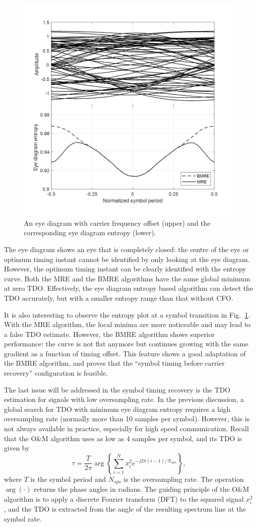 \documentclass[12pt, draftclsnofoot, onecolumn]{IEEEtran}
\begin{document}
\begin{figure}[ht]
\centering
\includegraphics[width=3 in]{pic/timing_freq.png}
\caption{An eye diagram with carrier frequency offset (upper) and the corresponding eye diagram entropy (lower).}
\label{fig:timing_freq} 
\end{figure}

The eye diagram shows an eye that is completely closed: the centre of the eye or optimum timing instant cannot be identified by only looking at the eye diagram.
However, the optimum timing instant can be clearly identified with the entropy curve.
Both the MRE and the BMRE algorithms have the same global minimum at zero TDO. 
Effectively, the eye diagram entropy based algorithm can detect the TDO accurately,
but with a smaller entropy range than that without CFO.

It is also interesting to observe the entropy plot at a symbol transition in Fig.~\ref{fig:timing_freq}.
With the MRE algorithm, the local minima are more noticeable and may lead to a false TDO estimate.
However, the BMRE algorithm shows superior performance:
the curve is not flat anymore but continues growing with the same gradient as a function of timing offset.
This feature shows a good adaptation of the BMRE algorithm, and proves that the ``symbol timing before carrier recovery'' configuration is feasible.


The last issue will be addressed in the symbol timing recovery is the TDO estimation for signals with low oversampling rate.
In the previous discussion, a global search for TDO with minimum eye diagram entropy requires a high oversampling rate (normally more than 10 samples per symbol).
However, this is not always available in practice, especially for high speed communication.
Recall that 
the O\&M algorithm uses as low as 4 samples per symbol, and its TDO is given by
\begin{equation}
\tau=\frac{T}{2\pi}\arg \left\{ {\sum\limits_{i = 1}^{N} {x_i^2{e^{ - j2\pi (i-1)/N_{sps}}}} } \right\},
\label{eq:om}
\end{equation}
where \(T\) is the symbol period and \(N_{sps}\) is the oversampling rate.
The operation \(\arg( \cdot )\) returns the phase angles in radians.
The guiding principle of the O\&M algorithm is to apply a discrete Fourier transform (DFT) to the squared signal \(x_i^2\),
and the TDO is extracted from the angle of the resulting spectrum line at the symbol rate.
\end{document}
